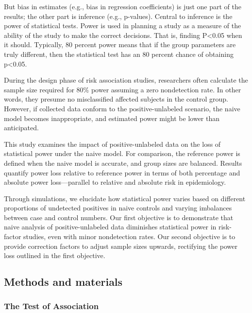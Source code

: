 \documentclass[
]{article}
\begin{document}
But bias in estimates (e.g., bias in regression coefficients) is just
one part of the results; the other part is inference (e.g., p-values).
Central to inference is the power of statistical tests. Power is used in
planning a study as a measure of the ability of the study to make the
correct decisions. That is, finding P\textless0.05 when it should.
Typically, 80 percent power means that if the group parameters are truly
different, then the statistical test has an 80 percent chance of
obtaining p\textless0.05.

During the design phase of risk association studies, researchers often
calculate the sample size required for 80\% power assuming a zero
nondetection rate. In other words, they presume no misclassified
affected subjects in the control group. However, if collected data
conform to the positive-unlabeled scenario, the naive model becomes
inappropriate, and estimated power might be lower than anticipated.

This study examines the impact of positive-unlabeled data on the loss of
statistical power under the naive model. For comparison, the reference
power is defined when the naive model is accurate, and group sizes are
balanced. Results quantify power loss relative to reference power in
terms of both percentage and absolute power loss---parallel to relative
and absolute risk in epidemiology.

Through simulations, we elucidate how statistical power varies based on
different proportions of undetected positives in naive controls and
varying imbalances between case and control numbers. Our first objective
is to demonstrate that naive analysis of positive-unlabeled data
diminishes statistical power in risk-factor studies, even with minor
nondetection rates. Our second objective is to provide correction
factors to adjust sample sizes upwards, rectifying the power loss
outlined in the first objective.

\newpage

\hypertarget{methods-and-materials}{%
\subsection{Methods and materials}\label{methods-and-materials}}

\hypertarget{the-test-of-association}{%
\subsubsection{The Test of Association}\label{the-test-of-association}}
\end{document}
